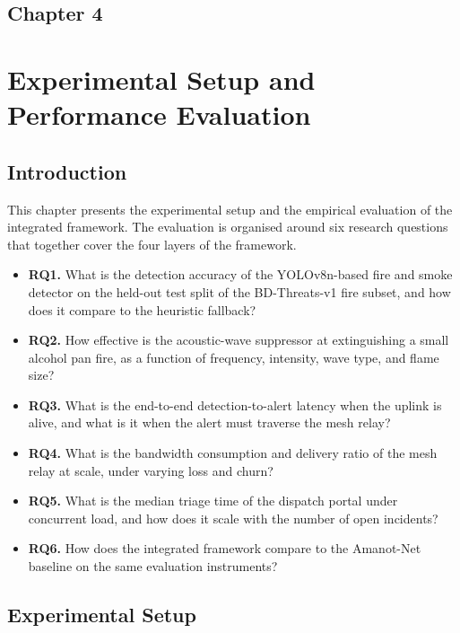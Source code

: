 \begin{center}
    \section*{\fontsize{20}{20}\selectfont Chapter 4}
\end{center}
\vspace{10mm}
\section{Experimental Setup and Performance Evaluation}

\subsection{Introduction}

This chapter presents the experimental setup and the empirical evaluation of the integrated framework. The evaluation is organised around six research questions that together cover the four layers of the framework.

\begin{itemize}
\item \textbf{RQ1.} What is the detection accuracy of the YOLOv8n-based fire and smoke detector on the held-out test split of the BD-Threats-v1 fire subset, and how does it compare to the heuristic fallback?
\item \textbf{RQ2.} How effective is the acoustic-wave suppressor at extinguishing a small alcohol pan fire, as a function of frequency, intensity, wave type, and flame size?
\item \textbf{RQ3.} What is the end-to-end detection-to-alert latency when the uplink is alive, and what is it when the alert must traverse the mesh relay?
\item \textbf{RQ4.} What is the bandwidth consumption and delivery ratio of the mesh relay at scale, under varying loss and churn?
\item \textbf{RQ5.} What is the median triage time of the dispatch portal under concurrent load, and how does it scale with the number of open incidents?
\item \textbf{RQ6.} How does the integrated framework compare to the Amanot-Net baseline on the same evaluation instruments?
\end{itemize}

\subsection{Experimental Setup}

